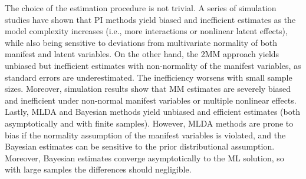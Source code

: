 \documentclass[11pt, a4paper]{article}
\begin{document}
The choice of the estimation procedure is not trivial. A series of simulation studies \citep{LeeEtAl_MultBehRes2004, HarringEtAl_PsyMeth2012, BrandtEtAl_SEM2014, KelavaEtAl_SEM2011, KelavaEtAl_SEM2014} have shown that PI methods yield biased and inefficient estimates as the model complexity increases (i.e., more interactions or nonlinear latent effects), while also being sensitive to deviations from multivariate normality of both manifest and latent variables. On the other hand, the 2MM approach \citep{Wall&Amemiya_JASA2000, Wall&Amemiya_BJMSP2003} yields unbiased but inefficient estimates with non-normality of the manifest variables, as standard errors are underestimated. The inefficiency worsens with small sample sizes. Moreover, simulation results show that MM estimates are severely biased and inefficient under non-normal manifest variables or multiple nonlinear effects. Lastly, MLDA and Bayesian methods yield unbiased and efficient estimates (both asymptotically and with finite samples). However, MLDA methods are prone to bias if the normality assumption of the manifest variables is violated, and the Bayesian estimates can be sensitive to the prior distributional assumption. Moreover, Bayesian estimates converge asymptotically to the ML solution, so with large samples the differences should negligible.
\end{document}
